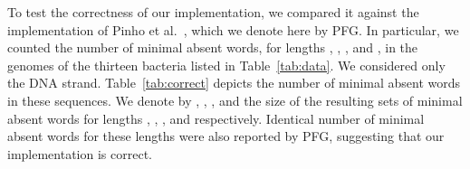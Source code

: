 \documentclass{llncs}
\begin{document}
  To test the correctness of our implementation, we compared it against
the implementation of Pinho et al.~\cite{Pinho2009}, which we denote here
by \textsf{PFG}.
  In particular, we counted the number of minimal absent words, for 
lengths , , , and , in the genomes of the thirteen 
bacteria listed in Table~\ref{tab:data}.
  We considered only the  DNA strand. 
  Table~\ref{tab:correct} depicts the number of minimal absent words in 
these sequences. 
  We denote by , , , 
and  the size of the resulting sets of minimal absent
words for lengths , , , and  respectively. 
  Identical number of minimal absent words for these lengths were also
reported by \textsf{PFG}, suggesting that our implementation is correct.

\begin{table}[!ht]
\vspace{0.25cm}
\begin{center}
\end{center}
\caption{Number of minimal absent words of lengths , , , 
and  in the genomes of thirteen bacteria.}
\label{tab:correct}
\end{table}
\end{document}
